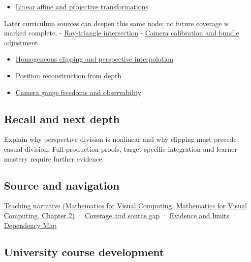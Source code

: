 \begin{itemize}
\tightlist
\item
  \hyperref[appendix-0bf0ca73f735]{Linear affine and projective transformations}
\end{itemize}

Later curriculum sources can deepen this same node; no future coverage is marked complete. - \hyperref[appendix-47ac1bd6d144]{Ray-triangle intersection} - \hyperref[appendix-3ee9861904d5]{Camera calibration and bundle adjustment}

\begin{itemize}
\tightlist
\item
  \hyperref[appendix-40426e4b2103]{Homogeneous clipping and perspective interpolation}
\item
  \hyperref[appendix-2cbf2968e866]{Position reconstruction from depth}
\item
  \hyperref[appendix-113f0267e5f4]{Camera gauge freedoms and observability}
\end{itemize}

\subsection{Recall and next depth}\label{appendix-cb3b26862282-recall-and-next-depth}

Explain why perspective division is nonlinear and why clipping must precede casual division. Full production proofs, target-specific integration and learner mastery require further evidence.

\subsection{Source and navigation}\label{appendix-cb3b26862282-source-and-navigation}

\href{../02-Mathematics-for-Visual-Computing/main.pdf\#nameddest=01-foundations-i-ch018-homogeneous-coordinates-preserve-the-role-of-a-location}{Teaching narrative (Mathematics for Visual Computing, Mathematics for Visual Computing, Chapter 2)} · \hyperref[appendix-fd090d982a15-phase-6---parts-501-600]{Coverage and source gap} · \hyperref[appendix-a103e7846d21-phase-6---source-analysis-and-verification]{Evidence and limits} · \hyperref[appendix-4ad47bdd269a]{Dependency Map}

\subsection{University course development}\label{appendix-cb3b26862282-university-course-development}

